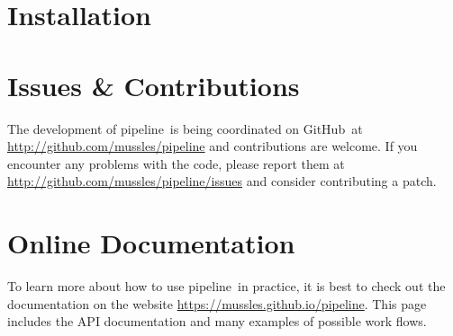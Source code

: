 \documentclass[12pt,preprint]{aastex}
\newcommand{\project}[1]{{\sffamily #1}}
\newcommand{\Python}{\project{Python}}
\newcommand{\github}{\project{GitHub}}
\newcommand{\thisplain}{pipeline}
\newcommand{\this}{\project{\thisplain}}
\newcommand{\sectlabel}[1]{\label{sect:#1}}
\begin{document}



\clearpage
\appendix
\section{Installation}\sectlabel{install}

\section{Issues \& Contributions}

The development of \this\ is being coordinated on \github\ at
\url{http://github.com/mussles/pipeline} and contributions are welcome. If you
encounter any problems with the code, please report them at
\url{http://github.com/mussles/pipeline/issues} and consider
contributing a patch.

\section{Online Documentation}

To learn more about how to use \this\ in practice, it is best to check out the
documentation on the website \url{https://mussles.github.io/pipeline}. This page includes
the API documentation and many examples of possible work flows.
\end{document}
